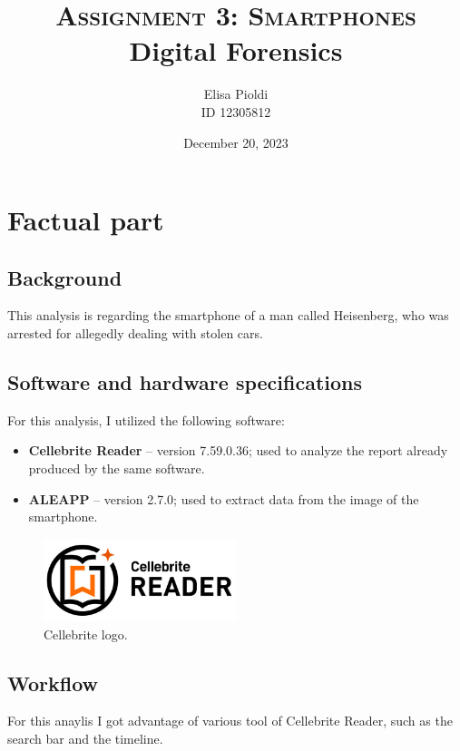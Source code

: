 \documentclass[12pt]{article}
\title{\textbf{\textsc{Assignment 3: Smartphones}}\\Digital Forensics}
\author{Elisa Pioldi\\
        ID 12305812}
\date{December 20, 2023}
\begin{document}
\maketitle

\section{Factual part}

\subsection{Background}

This analysis is regarding the smartphone of a man called Heisenberg, who was arrested for allegedly dealing with stolen cars.

\subsection{Software and hardware specifications}
\label{sec:specs}

For this analysis, I utilized the following software:

\begin{itemize}
    \item \textbf{Cellebrite Reader} \cite{cellebrity} -- version 7.59.0.36; used to analyze the report already produced by the same software.
    \item \textbf{ALEAPP} \cite{aleapp} -- version 2.7.0; used to extract data from the image of the smartphone.
\end{itemize}

\begin{figure}[!ht]
    \centering
    \includegraphics[width=0.5\textwidth]{images/cellebrite.jpg}
    \caption{Cellebrite logo.}
\end{figure}

\subsection{Workflow}

For this anaylis I got advantage of various tool of Cellebrite Reader, such as the search bar and the timeline.
\end{document}
